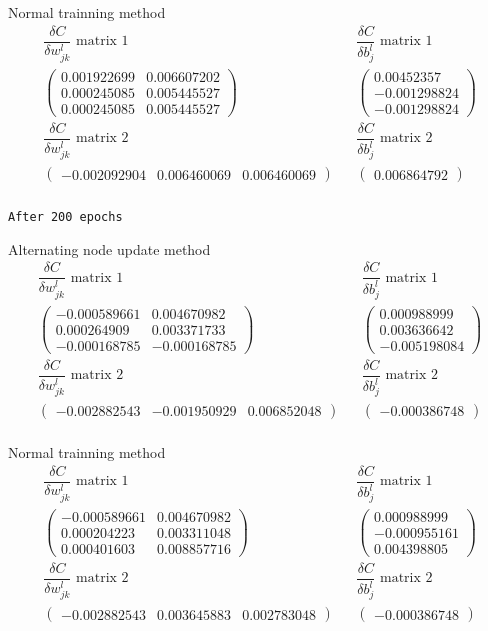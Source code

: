 \documentclass[12pt,english,]{article}
\newcommand{\mtx}[1]{\begin{pmatrix}#1\end{pmatrix}} %
\newcommand{\code}[1]{\colorbox{light-gray}{\texttt{#1}}}
\begin{document}
Normal trainning method
\begin{align*}
\text{$\dfrac{\delta C}{\delta w_{jk}^{l}}$ matrix 1} &&\text{$\dfrac{\delta C}{\delta b_{j}^{l}}$ matrix 1}\\
\mtx{0.001922699 & 0.006607202\\  0.000245085 & 0.005445527 \\ 0.000245085 & 0.005445527} &&\mtx{0.00452357 \\ -0.001298824 \\ -0.001298824 }\\
\text{$\dfrac{\delta C}{\delta w_{jk}^{l}}$ matrix 2} &&\text{$\dfrac{\delta C}{\delta b_{j}^{l}}$ matrix 2}\\
\mtx{-0.002092904 & 0.006460069 &  0.006460069} &&\mtx{0.006864792}\\
\end{align*}

\code{After 200 epochs}

Alternating node update method
\begin{align*}
\text{$\dfrac{\delta C}{\delta w_{jk}^{l}}$ matrix 1} &&\text{$\dfrac{\delta C}{\delta b_{j}^{l}}$ matrix 1}\\
\mtx{-0.000589661 & 0.004670982\\  0.000264909 & 0.003371733 \\ -0.000168785 & -0.000168785} &&\mtx{0.000988999 \\ 0.003636642 \\ -0.005198084 }\\
\text{$\dfrac{\delta C}{\delta w_{jk}^{l}}$ matrix 2} &&\text{$\dfrac{\delta C}{\delta b_{j}^{l}}$ matrix 2}\\
\mtx{-0.002882543 & -0.001950929 &  0.006852048} &&\mtx{-0.000386748}\\
\end{align*}

Normal trainning method
\begin{align*}
\text{$\dfrac{\delta C}{\delta w_{jk}^{l}}$ matrix 1} &&\text{$\dfrac{\delta C}{\delta b_{j}^{l}}$ matrix 1}\\
\mtx{-0.000589661 & 0.004670982\\  0.000204223 & 0.003311048 \\ 0.000401603 & 0.008857716} &&\mtx{0.000988999 \\ -0.000955161 \\ 0.004398805 }\\
\text{$\dfrac{\delta C}{\delta w_{jk}^{l}}$ matrix 2} &&\text{$\dfrac{\delta C}{\delta b_{j}^{l}}$ matrix 2}\\
\mtx{-0.002882543 & 0.003645883 &  0.002783048} &&\mtx{-0.000386748}\\
\end{align*}
\end{document}
